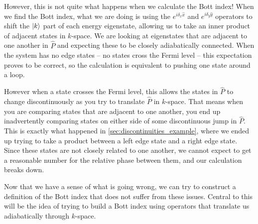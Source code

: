 However, this is not quite what happens when we calculate the Bott index! When we find the Bott index, what we are doing is using the $e^{i\delta_x \hat x}$ and $e^{i\delta_y \hat y}$ operators to shift the $\ket k$ part of each energy eigenstate, allowing us to take an inner product of adjacent states in $k$-space. We are looking at eigenstates that are adjacent to one another in $\hat P$ and expecting these to be closely adiabatically connected. When the system has no edge states -- no states cross the Fermi level -- this expectation proves to be correct, so the calculation is equivalent to pushing one state around a loop.
\begin{center}
\end{center}
However when a state crosses the Fermi level, this allows the states in $\hat P$ to change discontinuously as you try to translate $\hat P$ in $k$-space. That means when you are comparing states that are adjacent to one another, you end up inadvertently comparing states on either side of some discontinuous jump in $\hat P$. This is exactly what happened in \textsection\ref{sec:discontinuities_example}, where we ended up trying to take a product between a left edge state and a right edge state. Since these states are not closely related to one another, we cannot expect to get a reasonable number for the relative phase between them, and our calculation breaks down.\par
Now that we have a sense of what is going wrong, we can try to construct a definition of the Bott index that does not suffer from these issues. Central to this will be the idea of trying to build a Bott index using operators that translate us adiabatically through $k$-space.

